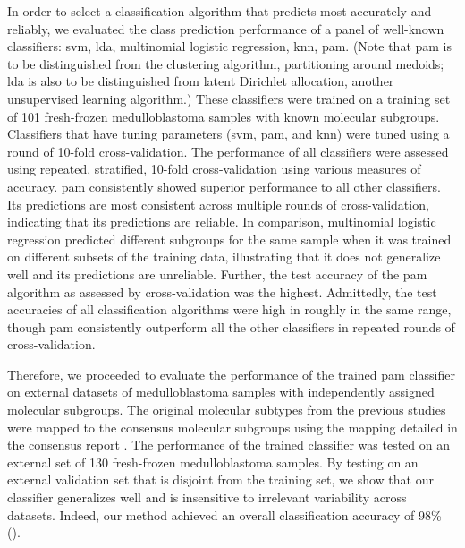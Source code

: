 In order to select a classification algorithm that predicts most accurately and reliably, we evaluated the class prediction performance of a panel of well-known classifiers: \gls{svm}, \gls{lda}, multinomial logistic regression, \gls{knn}, \gls{pam}. (Note that \gls{pam} is to be distinguished from the clustering algorithm, partitioning around medoids; \gls{lda} is also to be distinguished from latent Dirichlet allocation, another unsupervised learning algorithm.)  These classifiers were trained on a training set of 101 fresh-frozen medulloblastoma samples with known molecular subgroups. Classifiers that have tuning parameters (\gls{svm}, \gls{pam}, and \gls{knn}) were tuned using a round of 10-fold cross-validation. The performance of all classifiers were assessed using repeated, stratified, 10-fold cross-validation using various measures of accuracy. \gls{pam} consistently showed superior performance to all other classifiers. Its predictions are most consistent across multiple rounds of cross-validation, indicating that its predictions are reliable. In comparison, multinomial logistic regression predicted different subgroups for the same sample when it was trained on different subsets of the training data, illustrating that it does not generalize well and its predictions are unreliable. Further, the test accuracy of the \gls{pam} algorithm as assessed by cross-validation was the highest. Admittedly, the test accuracies of all classification algorithms were high in roughly in the same range, though \gls{pam} consistently outperform all the other classifiers in repeated rounds of cross-validation.

Therefore, we proceeded to evaluate the performance of the trained \gls{pam} classifier on external datasets of medulloblastoma samples with independently assigned molecular subgroups. The original molecular subtypes from the previous studies were mapped to the consensus molecular subgroups using the mapping detailed in the consensus report . The performance of the trained classifier was tested on an external set of 130 fresh-frozen medulloblastoma samples. By testing on an external validation set that is disjoint from the training set, we show that our classifier generalizes well and is insensitive to irrelevant variability across datasets. Indeed, our method achieved an overall classification accuracy of 98\% ().

